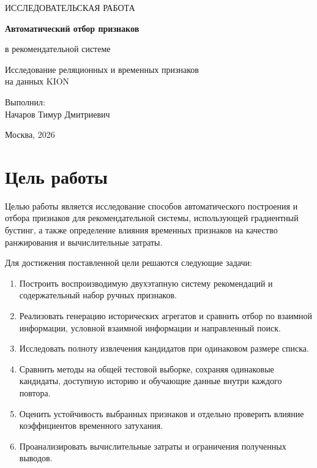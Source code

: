 \documentclass[12pt,a4paper]{article}
\begin{document}
\begin{titlepage}
\centering
\vspace*{22mm}
{\large ИССЛЕДОВАТЕЛЬСКАЯ РАБОТА\par}
\vspace{24mm}
{\LARGE\bfseries Автоматический отбор признаков\par}
\vspace{5mm}
{\Large в рекомендательной системе\par}
\vspace{7mm}
{\large Исследование реляционных и временных признаков\\на данных KION\par}
\vspace{30mm}
\begin{flushright}
Выполнил:\\[3mm]
Начаров Тимур Дмитриевич
\end{flushright}
\vfill
Москва, 2026
\end{titlepage}
\setcounter{page}{1}
\tableofcontents
\clearpage

\section{Цель работы}
Целью работы является исследование способов автоматического построения и
отбора признаков для рекомендательной системы, использующей градиентный
бустинг, а также определение влияния временных признаков на качество
ранжирования и вычислительные затраты.

Для достижения поставленной цели решаются следующие задачи:
\begin{enumerate}
\item Построить воспроизводимую двухэтапную систему рекомендаций и
содержательный набор ручных признаков.
\item Реализовать генерацию исторических агрегатов и сравнить отбор
по взаимной информации, условной взаимной информации и направленный поиск.
\item Исследовать полноту извлечения кандидатов при одинаковом размере списка.
\item Сравнить методы на общей тестовой выборке, сохраняя одинаковые
кандидаты, доступную историю и обучающие данные внутри каждого повтора.
\item Оценить устойчивость выбранных признаков и отдельно проверить
влияние коэффициентов временного затухания.
\item Проанализировать вычислительные затраты и ограничения полученных выводов.
\end{enumerate}
\end{document}
